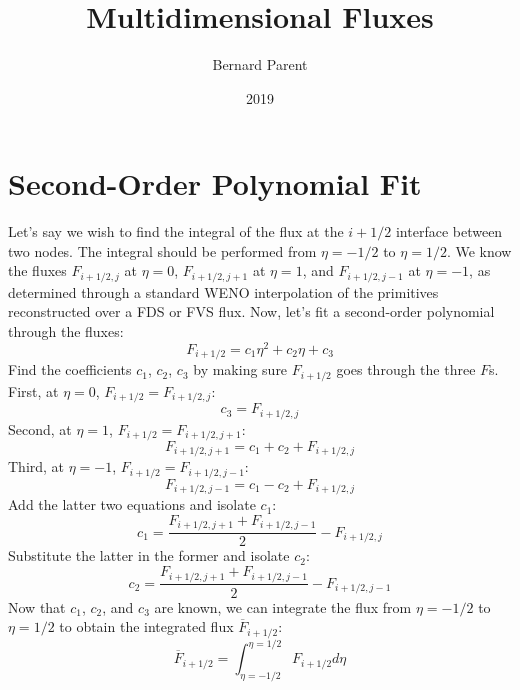 \documentclass{warpdoc}
\author{
  Bernard Parent
}
\title{
  Multidimensional Fluxes
}
\date{
  2019
}
\begin{document}
  \pagestyle{headings}
  \setcounter{page}{1}
  \makewarpdoctitle
  \tableofcontents


\section{Second-Order Polynomial Fit}

Let's say we wish to find the integral of the flux at the $i+1/2$ interface between two nodes. The integral should be performed from $\eta=-1/2$ to $\eta=1/2$. We know the fluxes $F_{i+1/2,j}$ at $\eta=0$, $F_{i+1/2,j+1}$ at $\eta=1$, and $F_{i+1/2,j-1}$ at $\eta=-1$, as determined through a standard WENO interpolation \cite{jcp:1994:liu}
 of the primitives reconstructed over a FDS \cite{jcp:1981:roe} or FVS flux. Now, let's fit a second-order polynomial through the fluxes:
%
\begin{equation}
F_{i+1/2}=c_1 \eta^2 + c_2 \eta + c_3 
\end{equation}
% 
Find the coefficients $c_1$, $c_2$, $c_3$ by making sure $F_{i+1/2}$ goes through the three $F$s. First, at $\eta=0$, $F_{i+1/2}=F_{i+1/2,j}$:
%
\begin{equation}
c_3=F_{i+1/2,j}
\end{equation}
%
Second, at $\eta=1$, $F_{i+1/2}=F_{i+1/2,j+1}$:
%
\begin{equation}
F_{i+1/2,j+1}=c_1  + c_2  + F_{i+1/2,j} 
\end{equation}
% 
Third, at $\eta=-1$, $F_{i+1/2}=F_{i+1/2,j-1}$:
%
\begin{equation}
F_{i+1/2,j-1}=c_1  - c_2  + F_{i+1/2,j} 
\end{equation}
% 
Add the latter two equations and isolate $c_1$:
%
\begin{equation}
c_1=\frac{F_{i+1/2,j+1}+F_{i+1/2,j-1}}{2}- F_{i+1/2,j} 
\end{equation}
% 
Substitute the latter in the former and isolate $c_2$:
%
\begin{equation}
c_2=\frac{F_{i+1/2,j+1}+F_{i+1/2,j-1}}{2} -F_{i+1/2,j-1}
\end{equation}
% 
Now that $c_1$, $c_2$, and $c_3$ are known, we can integrate the flux from $\eta=-1/2$ to $\eta=1/2$ to obtain the integrated flux $\overline{F}_{i+1/2}$:
%
\begin{equation}
\overline{F}_{i+1/2}=\int_{\eta=-1/2}^{\eta=1/2} F_{i+1/2} d\eta
\end{equation}
\end{document}
